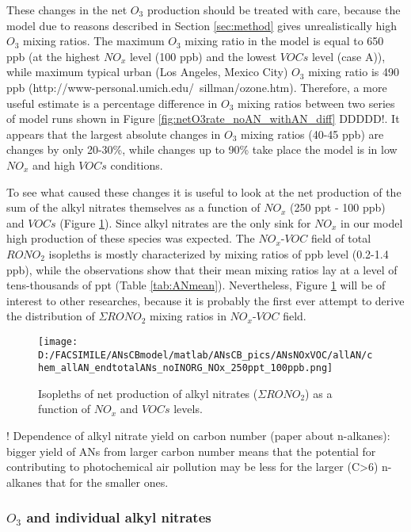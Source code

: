 \documentclass[11pt,a4paper]{article}
\begin{document}
These changes in the net $O_3$ production should be treated with care, because the model due to reasons described in Section \ref{sec:method} gives unrealistically high $O_3$ mixing ratios. The maximum $O_3$ mixing ratio in the model is equal to 650 ppb (at the highest $NO_x$ level (100 ppb) and the lowest $VOCs$ level (case A)), while maximum typical urban (Los Angeles, Mexico City) $O_3$ mixing ratio is 490 ppb (http://www-personal.umich.edu/~sillman/ozone.htm). Therefore, a more useful estimate is a percentage difference in $O_3$ mixing ratios between two series of model runs shown in Figure \ref{fig:netO3rate_noAN_withAN_diff} DDDDD!. It appears that the largest absolute changes in $O_3$ mixing ratios (40-45 ppb) are changes by only 20-30\%, while changes up to 90\% take place the model is in low $NO_x$ and high $VOCs$ conditions.

To see what caused these changes it is useful to look at the net production of the sum of the alkyl nitrates themselves as a function of $NO_x$ (250 ppt - 100 ppb) and $VOCs$ (Figure \ref{fig:endtotalANs}). Since alkyl nitrates are the only sink for $NO_x$ in our model high production of these species was expected. The $NO_x$-$VOC$ field of total $RONO_2$ isopleths is mostly characterized by mixing ratios of ppb level (0.2-1.4 ppb), while the observations show that their mean mixing ratios lay at a level of tens-thousands of ppt (Table \ref{tab:ANmean}). Nevertheless, Figure \ref{fig:endtotalANs} will be of interest to other researches, because it is probably the first ever attempt to derive the distribution of $\Sigma RONO_2$ mixing ratios in $NO_x$-$VOC$ field.

\begin{figure} %
\texttt{[image: D:/FACSIMILE/ANsCBmodel/matlab/ANsCB\_pics/ANsNOxVOC/allAN/chem\_allAN\_endtotalANs\_noINORG\_NOx\_250ppt\_100ppb.png]}
\caption{Isopleths of net production of alkyl nitrates ($\Sigma RONO_2$) as a function of $NO_x$ and $VOCs$ levels.}\label{fig:endtotalANs}
\end{figure}
! Dependence of alkyl nitrate yield on carbon number (paper about n-alkanes): bigger yield of ANs from larger carbon number means that the potential for contributing to photochemical air pollution may be less for the larger (C>6) n-alkanes that for the smaller ones.

\subsubsection{$O_3$ and individual alkyl nitrates}
\end{document}
